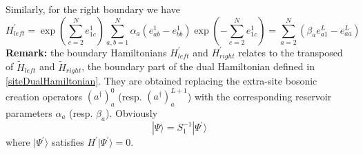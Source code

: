 \documentclass[10pt]{article}
\numberwithin{equation}{section}
\numberwithin{equation}{subsection}
\begin{document}
Similarly, for the right boundary we have 
\begin{equation}
H_{left}^{'}=\exp{\left(\sum_{c=2}^{N}e_{1c}^{1}\right)}\sum_{a,b=1}^{N}\alpha_{a}\left(e_{ab}^{1}-e_{bb}^{1}\right)\exp{\left(-\sum_{c=2}^{N}e_{1c}^{1}\right)}=\sum_{a=2}^{N}\left(\beta_{a}e_{a1}^{L}-e_{aa}^{L}\right)
\end{equation}
\textbf{Remark:} the boundary Hamiltonians $H_{left}^{'}$ and $H_{right}^{'}$ relates to the transposed of  $\widetilde{H}_{left}$ and $\widetilde{H}_{right}$, the boundary part of the dual Hamiltonian  defined in \eqref{siteDualHamiltonian}. They are obtained replacing the  extra-site bosonic creation operators $(a^{\dagger})_{a}^{0}$  (resp. $(a^{\dagger})_{a}^{L+1}$) with the corresponding reservoir parameters $\alpha_a$ (resp. $\beta_a$).
\newline\newline
Obviously
\begin{equation}\label{S1-Inverse}
	|\Psi\rangle =S_{1}^{-1}|\Psi^{'}\rangle
\end{equation}
where $|\Psi^{'}\rangle$ satisfies $H^{'}|\Psi^{'}\rangle=0$.
\end{document}
